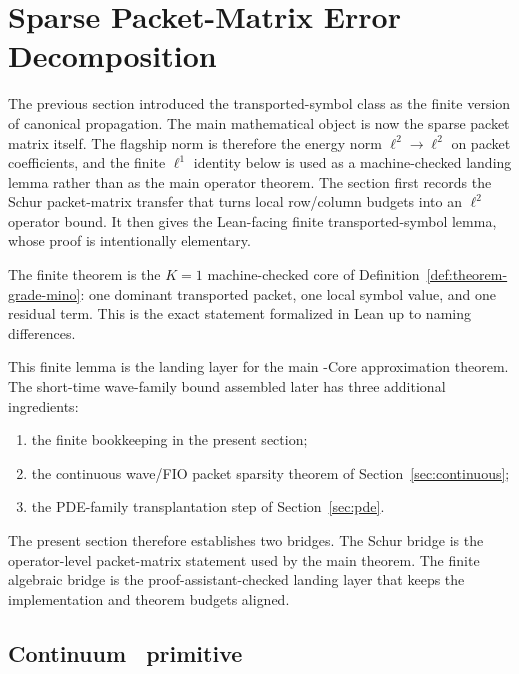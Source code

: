 \section{Sparse Packet-Matrix Error Decomposition}
\label{sec:theory}

The previous section introduced the transported-symbol class as the finite version of canonical propagation.  The main mathematical object is now the sparse packet matrix itself.  The flagship norm is therefore the energy norm $\ell^2\to\ell^2$ on packet coefficients, and the finite $\ell^1$ identity below is used as a machine-checked landing lemma rather than as the main operator theorem.  The section first records the Schur packet-matrix transfer that turns local row/column budgets into an $\ell^2$ operator bound.  It then gives the Lean-facing finite transported-symbol lemma, whose proof is intentionally elementary.

The finite theorem is the $K=1$ machine-checked core of Definition~\ref{def:theorem-grade-mino}: one dominant transported packet, one local symbol value, and one residual term. This is the exact statement formalized in Lean up to naming differences.

This finite lemma is the landing layer for the main \MiNO-Core approximation theorem. The short-time wave-family bound assembled later has three additional ingredients:
\begin{enumerate}
\item the finite bookkeeping in the present section;
\item the continuous wave/FIO packet sparsity theorem of Section~\ref{sec:continuous};
\item the PDE-family transplantation step of Section~\ref{sec:pde}.
\end{enumerate}
The present section therefore establishes two bridges.  The Schur bridge is the operator-level packet-matrix statement used by the main theorem.  The finite algebraic bridge is the proof-assistant-checked landing layer that keeps the implementation and theorem budgets aligned.

\subsection{Continuum \MiNO\ primitive}
\label{sec:continuum-mino-primitive}

